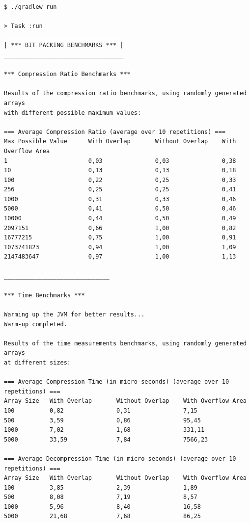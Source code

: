 \documentclass[titlepage]{article}
\begin{document}
\begin{lstlisting} 
$ ./gradlew run                

> Task :run
__________________________________
| *** BIT PACKING BENCHMARKS *** |
__________________________________

*** Compression Ratio Benchmarks ***

Results of the compression ratio benchmarks, using randomly generated arrays
with different possible maximum values:

=== Average Compression Ratio (average over 10 repetitions) ===
Max Possible Value      With Overlap       Without Overlap    With Overflow Area
1                       0,03               0,03               0,38              
10                      0,13               0,13               0,18              
100                     0,22               0,25               0,33              
256                     0,25               0,25               0,41              
1000                    0,31               0,33               0,46              
5000                    0,41               0,50               0,46              
10000                   0,44               0,50               0,49              
2097151                 0,66               1,00               0,82              
16777215                0,75               1,00               0,91              
1073741823              0,94               1,00               1,09              
2147483647              0,97               1,00               1,13              

______________________________

*** Time Benchmarks ***

Warming up the JVM for better results...
Warm-up completed.

Results of the time measurements benchmarks, using randomly generated arrays
at different sizes:

=== Average Compression Time (in micro-seconds) (average over 10 repetitions) ===
Array Size   With Overlap       Without Overlap    With Overflow Area
100          0,82               0,31               7,15              
500          3,59               0,86               95,45             
1000         7,02               1,68               331,11            
5000         33,59              7,84               7566,23           

=== Average Decompression Time (in micro-seconds) (average over 10 repetitions) ===
Array Size   With Overlap       Without Overlap    With Overflow Area
100          3,85               2,39               1,89              
500          8,08               7,19               8,57              
1000         5,96               8,40               16,58             
5000         21,68              7,68               86,25             


\end{lstlisting}
\end{document}
